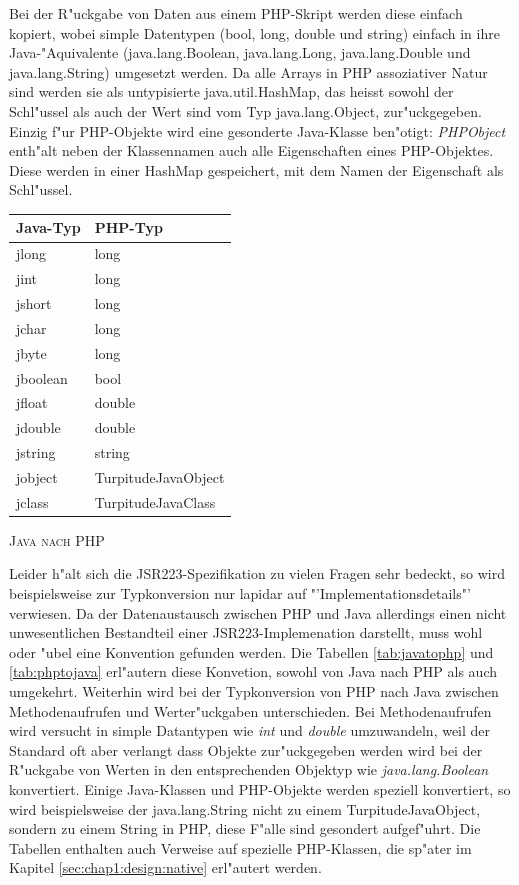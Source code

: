 Bei der R"uckgabe von Daten aus einem PHP-Skript werden diese einfach kopiert, wobei simple Datentypen (bool, long, double und string)
einfach in ihre Java-"Aquivalente (java.lang.Boolean, java.lang.Long, java.lang.Double und java.lang.String) umgesetzt werden.
Da alle Arrays in PHP assoziativer Natur sind werden sie als untypisierte java.util.HashMap, das heisst sowohl der Schl"ussel als auch der Wert
sind vom Typ java.lang.Object, zur"uckgegeben. Einzig f"ur PHP-Objekte wird eine gesonderte Java-Klasse ben"otigt: \emph{PHPObject} enth"alt neben
der Klassennamen auch alle Eigenschaften eines PHP-Objektes. Diese werden in einer HashMap gespeichert, mit dem Namen der Eigenschaft
als Schl"ussel.
\begin{floatingtable}{
\label{tab:javatophp}
\begin{tabular}{|l|l|}
\hline
Java-Typ & PHP-Typ\\
\hline\hline
jlong & long\\
jint & long\\
jshort & long\\
jchar & long\\
jbyte & long\\
jboolean & bool\\
jfloat & double\\
jdouble & double\\
jstring & string\\
jobject & TurpitudeJavaObject\\
jclass & TurpitudeJavaClass\\
\hline
\end{tabular}}
\caption{\textsc{Java nach PHP}}
\end{floatingtable}
Leider h"alt sich die JSR223-Spezifikation zu vielen Fragen sehr bedeckt, so wird beispielsweise zur Typkonversion nur lapidar auf 
"'Implementationsdetails"' verwiesen. Da der Datenaustausch zwischen PHP und Java allerdings einen nicht unwesentlichen Bestandteil
einer JSR223-Implemenation darstellt, muss wohl oder "ubel eine Konvention gefunden werden. Die Tabellen \ref{tab:javatophp} und \ref{tab:phptojava}
erl"autern diese Konvetion, sowohl von Java nach PHP als auch umgekehrt. Weiterhin wird bei der Typkonversion von PHP nach Java zwischen 
Methodenaufrufen und Werter"uckgaben unterschieden. Bei Methodenaufrufen wird versucht in simple Datantypen wie \emph{int} und \emph{double}
umzuwandeln, weil der Standard oft aber verlangt dass Objekte zur"uckgegeben werden wird bei der R"uckgabe von Werten in den entsprechenden
Objektyp wie \emph{java.lang.Boolean} konvertiert. Einige Java-Klassen und PHP-Objekte werden speziell konvertiert, so wird beispielsweise
der java.lang.String nicht zu einem TurpitudeJavaObject, sondern zu einem String in PHP, diese F"alle sind gesondert aufgef"uhrt. Die
Tabellen enthalten auch Verweise auf spezielle PHP-Klassen, die sp"ater im Kapitel \ref{sec:chap1:design:native} erl"autert werden.

